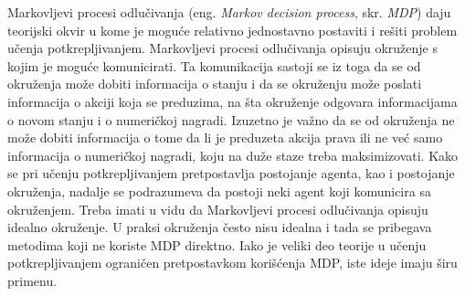 Markovljevi procesi odlučivanja (eng. {\em Markov decision process}, skr. {\em MDP}) daju teorijski okvir u kome je moguće relativno jednostavno postaviti i rešiti problem učenja potkrepljivanjem. Markovljevi procesi odlučivanja opisuju okruženje s kojim je moguće komunicirati. Ta komunikacija sastoji se iz toga da se od okruženja može dobiti informacija o stanju i da se okruženju može poslati informacija o akciji koja se preduzima, na šta okruženje odgovara informacijama o novom stanju i o numeričkoj nagradi. Izuzetno je važno da se od okruženja ne može dobiti informacija o tome da li je preduzeta akcija prava ili ne već samo informacija o numeričkoj nagradi, koju na duže staze treba maksimizovati. Kako se pri učenju potkrepljivanjem pretpostavlja postojanje agenta, kao i postojanje okruženja, nadalje se podrazumeva da postoji neki agent koji komunicira sa okruženjem. Treba imati u vidu da Markovljevi procesi odlučivanja opisuju idealno okruženje. U praksi okruženja često nisu idealna i tada se pribegava metodima koji ne koriste MDP direktno. Iako je veliki deo teorije u učenju potkrepljivanjem ograničen pretpostavkom korišćenja MDP, iste ideje imaju širu primenu.

